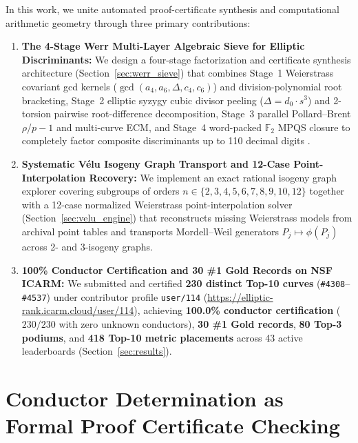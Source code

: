 \documentclass[10pt,a4paper]{article}
\theoremstyle{plain}
\theoremstyle{definition}
\theoremstyle{remark}
\begin{document}
In this work, we unite automated proof-certificate synthesis and computational arithmetic geometry through three primary contributions:
\begin{enumerate}[leftmargin=2em]
    \item \textbf{The 4-Stage Werr Multi-Layer Algebraic Sieve for Elliptic Discriminants:} We design a four-stage factorization and certificate synthesis architecture (Section~\ref{sec:werr_sieve}) that combines Stage~1 Weierstrass covariant gcd kernels ($\gcd(a_4, a_6, \Delta, c_4, c_6)$) and division-polynomial root bracketing, Stage~2 elliptic syzygy cubic divisor peeling ($\Delta = d_0 \cdot s^3$) and 2-torsion pairwise root-difference decomposition, Stage~3 parallel Pollard--Brent $\rho$/$p-1$ and multi-curve ECM, and Stage~4 word-packed $\mathbb{F}_2$ MPQS closure to completely factor composite discriminants up to 110 decimal digits \cite{dagli2026zenodo,dagli2026sieve}.
    \item \textbf{Systematic V\'{e}lu Isogeny Graph Transport and 12-Case Point-Interpolation Recovery:} We implement an exact rational isogeny graph explorer covering subgroups of orders $n \in \{2, 3, 4, 5, 6, 7, 8, 9, 10, 12\}$ together with a 12-case normalized Weierstrass point-interpolation solver (Section~\ref{sec:velu_engine}) that reconstructs missing Weierstrass models from archival point tables and transports Mordell--Weil generators $P_j \mapsto \phi(P_j)$ across 2- and 3-isogeny graphs.
    \item \textbf{100\% Conductor Certification and 30 \#1 Gold Records on NSF ICARM:} We submitted and certified \textbf{230 distinct Top-10 curves} (\texttt{\#4308}--\texttt{\#4537}) under contributor profile \texttt{user/114} (\url{https://elliptic-rank.icarm.cloud/user/114}), achieving \textbf{100.0\% conductor certification} ($230/230$ with zero unknown conductors), \textbf{30 \#1 Gold records}, \textbf{80 Top-3 podiums}, and \textbf{418 Top-10 metric placements} across 43 active leaderboards (Section~\ref{sec:results}).
\end{enumerate}

\section{Conductor Determination as Formal Proof Certificate Checking}
\end{document}
